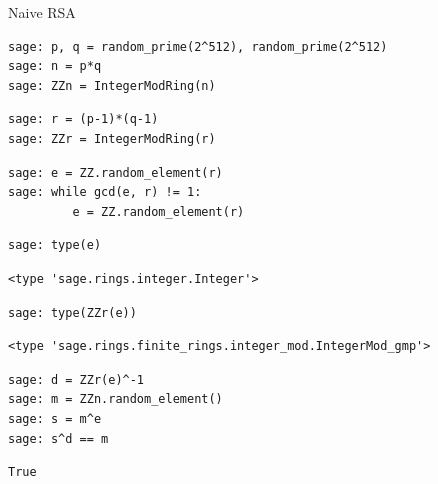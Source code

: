 \documentclass[presentation,smaller]{beamer}
\begin{document}
\begin{frame}{Naive RSA}
 \lstset{language=sage,label= ,caption= ,captionpos=b,numbers=none}
\begin{lstlisting}
sage: p, q = random_prime(2^512), random_prime(2^512)
sage: n = p*q
sage: ZZn = IntegerModRing(n)
\end{lstlisting}

\lstset{language=sage,label= ,caption= ,captionpos=b,numbers=none}
\begin{lstlisting}
sage: r = (p-1)*(q-1)
sage: ZZr = IntegerModRing(r)
\end{lstlisting}

\lstset{language=sage,label= ,caption= ,captionpos=b,numbers=none}
\begin{lstlisting}
sage: e = ZZ.random_element(r)
sage: while gcd(e, r) != 1:
         e = ZZ.random_element(r)
\end{lstlisting}

\framebreak{}

\lstset{language=sage,label= ,caption= ,captionpos=b,numbers=none}
\begin{lstlisting}
sage: type(e)
\end{lstlisting}

\begin{verbatim}
<type 'sage.rings.integer.Integer'>
\end{verbatim}

\lstset{language=sage,label= ,caption= ,captionpos=b,numbers=none}
\begin{lstlisting}
sage: type(ZZr(e))
\end{lstlisting}

\begin{verbatim}
<type 'sage.rings.finite_rings.integer_mod.IntegerMod_gmp'>
\end{verbatim}

\lstset{language=sage,label= ,caption= ,captionpos=b,numbers=none}
\begin{lstlisting}
sage: d = ZZr(e)^-1
sage: m = ZZn.random_element()
sage: s = m^e
sage: s^d == m
\end{lstlisting}

\begin{verbatim}
True
\end{verbatim}
\end{frame}
\end{document}
